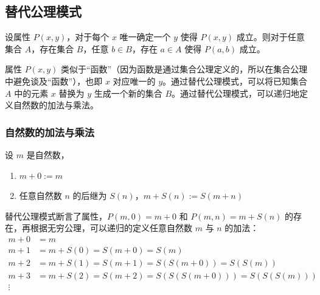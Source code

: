 \vspace{1em}

\subsection{替代公理模式}

\begin{axiom}
    设属性 $ P(x,y) $，对于每个 $ x $ 唯一确定一个 $ y $ 使得 $ P(x,y) $ 成立。则对于任意集合 $ A $，存在集合 $ B $，任意 $  b\in B $，存在 $ a\in A $ 使得 $ P(a,b) $ 成立。
\end{axiom}

\begin{note}
    属性 $ P(x,y) $ 类似于“函数”（因为函数是通过集合公理定义的，所以在集合公理中避免谈及“函数”），也即 $ x $ 对应唯一的 $ y $。通过替代公理模式，可以将已知集合 $ A $ 中的元素 $ x $ 替换为 $ y $ 生成一个新的集合 $ B $。通过替代公理模式，可以递归地定义自然数的加法与乘法。
\end{note}

\vspace{1em}

\subsubsection*{自然数的加法与乘法}

\begin{definition}[自然数的加法]
    设 $m$ 是自然数，
    \begin{enumerate}
        \item $ m+0:=m $
        \item 任意自然数 $ n $ 的后继为 $ S(n) $，$ m+S(n):=S(m+n) $
    \end{enumerate}
\end{definition}

\begin{note}
    替代公理模式断言了属性，$P(m,0)=m+0$ 和 $P(m,n)=m+S(n)$ 的存在，再根据无穷公理，可以递归的定义任意自然数 $m$ 与 $n$ 的加法：
    \begin{align*}
        m+0 &= m\\
        m+1 &= m+S(0) = S(m+0)= S(m)\\
        m+2 &= m+S(1) = S(m+1)=S(S(m+0))=S(S(m))\\
        m+3 &= m+S(2) = S(m+2)=S(S(S(m+0)))=S(S(S(m)))\\
        \vdots
    \end{align*}
\end{note}
\newpage

